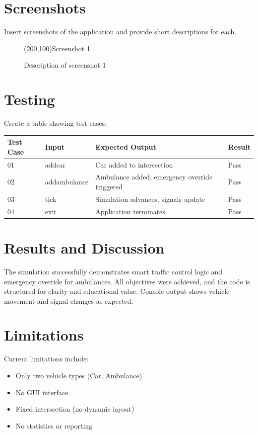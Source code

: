 \documentclass[12pt,a4paper]{article}
\begin{document}
\section{Screenshots}
Insert screenshots of the application and provide short descriptions for each.
\begin{figure}[h]
    \centering
    \framebox(200,100){Screenshot 1}
    \caption{Description of screenshot 1}
\end{figure}

\section{Testing}
Create a table showing test cases.

\begin{table}[h]
    \centering
    \begin{tabularx}{\textwidth}{|l|X|X|l|}
        \hline
        \textbf{Test Case} & \textbf{Input} & \textbf{Expected Output} & \textbf{Result} \\ \hline
    01 & addcar & Car added to intersection & Pass \\ \hline
    02 & addambulance & Ambulance added, emergency override triggered & Pass \\ \hline
    03 & tick & Simulation advances, signals update & Pass \\ \hline
    04 & exit & Application terminates & Pass \\ \hline
    \end{tabularx}
\end{table}

\section{Results and Discussion}
The simulation successfully demonstrates smart traffic control logic and emergency override for ambulances. All objectives were achieved, and the code is structured for clarity and educational value. Console output shows vehicle movement and signal changes as expected.

\section{Limitations}
Current limitations include:
\begin{itemize}
    \item Only two vehicle types (Car, Ambulance)
    \item No GUI interface
    \item Fixed intersection (no dynamic layout)
    \item No statistics or reporting
\end{itemize}
\end{document}
